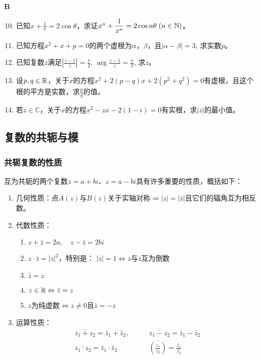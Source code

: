 \begin{center}
    \bfseries B
\end{center}

\begin{enumerate}\setcounter{enumi}{9}
    \item 已知$x+\frac{1}{x}=2\cos\theta$，求证$x^n+\dfrac{1}{x^n}=2\cos n\theta\; (n\in\mathbb{N})$。
    \item 已知方程$x^2+x+p=0$的两个虚根为$\alpha$，$\beta$，且$|\alpha-\beta|=3$, 求实数$p$。
    \item 已知复数$z$满足$\left|\frac{z-1}{z}\right|=\frac{1}{2}$, $\arg\frac{z-1}{z}=\frac{\pi}{3}$, 求$z$。
    \item 设$p,q\in\mathbb{R}$，关于$x$的方程$x^2+2(p-q)x+2(p^2+q^2)=0$有虚根，且这个根的平方是实数，求$\frac{p}{q}$的值。
    \item 若$z\in\mathbb{C}$，关于$x$的方程$x^2-zx-2(1-i)=0$有实根，求$|z|$的最小值。
\end{enumerate}

\subsection{复数的共轭与模}

\subsubsection{共轭复数的性质}
    
    互为共轭的两个复数$z=a+bi$、$z=a-bi$具有许多重要的性质，概括如下：
\begin{enumerate}
    \item 几何性质：点$A(z)$与$B(z)$关于实轴对称$\Rightarrow |z|=|\bar z|$且它们的辐角互为相反数。
    \item 代数性质：
\begin{enumerate}[(1)]
    \item $z+\bar z=2a,\quad z-\bar z=2bi$
    \item $z\cdot \bar z=|z|^2$，特别是：
    $|z|=1\Leftrightarrow z$与$\bar z$互为倒数
    \item $\bar{\bar z}=z$
    \item $z\in\mathbb{R}\Leftrightarrow \bar z=z$
    \item $z$为纯虚数$\Leftrightarrow z\ne 0$且$\bar z=-z$
\end{enumerate}
\item 运算性质：
\[\begin{split}
    \overline{z_1+z_2}=\bar z_1+\bar z_2,&\qquad \overline{z_1-z_2}=\bar z_1-\bar z_2\\
    \overline{z_1\cdot z_2}=\bar z_1\cdot \bar z_2 &\qquad \overline{\left(\frac{z_1}{z_2}\right)}=\frac{\bar z_1}{\bar z_2}
\end{split} \]
\end{enumerate}
    
